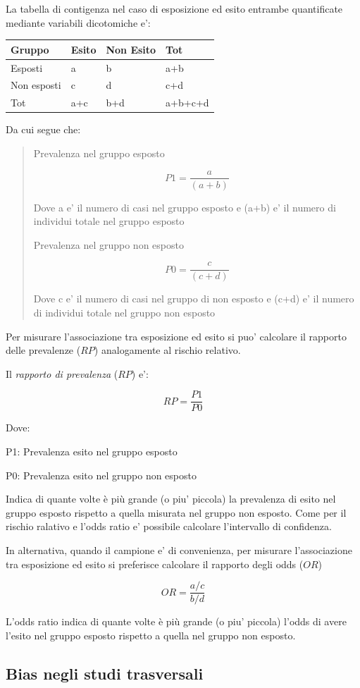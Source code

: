 \documentclass[]{book}
\begin{document}
La tabella di contigenza nel caso di esposizione ed esito entrambe quantificate mediante variabili dicotomiche e':

\begin{longtable}[]{@{}llll@{}}
\toprule
Gruppo & Esito & Non Esito & Tot\tabularnewline
\midrule
\endhead
Esposti & a & b & a+b\tabularnewline
Non esposti & c & d & c+d\tabularnewline
Tot & a+c & b+d & a+b+c+d\tabularnewline
\bottomrule
\end{longtable}

Da cui segue che:

\begin{quote}
Prevalenza nel gruppo esposto

\[P1 = \frac{a}{(a+b)}\]

Dove a e' il numero di casi nel gruppo esposto e (a+b) e' il numero di individui totale nel gruppo esposto

Prevalenza nel gruppo non esposto

\[P0 = \frac{c}{(c+d)}\]

Dove c e' il numero di casi nel gruppo di non esposto e (c+d) e' il numero di individui totale nel gruppo non esposto
\end{quote}

Per misurare l'associazione tra esposizione ed esito si puo' calcolare il rapporto delle prevalenze (\(RP\)) analogamente al rischio relativo.

Il \emph{rapporto di prevalenza} (\(RP\)) e':

\[ RP = \frac{ P1 }{P0}\]

Dove:

P1: Prevalenza esito nel gruppo esposto

P0: Prevalenza esito nel gruppo non esposto

Indica di quante volte è più grande (o piu' piccola) la prevalenza di esito nel gruppo esposto rispetto a quella misurata nel gruppo non esposto. Come per il rischio ralativo e l'odds ratio e' possibile calcolare l'intervallo di confidenza.

In alternativa, quando il campione e' di convenienza, per misurare l'associazione tra esposizione ed esito si preferisce calcolare il rapporto degli odds (\(OR\))

\[ OR = \frac{ a / c }{b / d} \]

L'odds ratio indica di quante volte è più grande (o piu' piccola) l'odds di avere l'esito nel gruppo esposto rispetto a quella nel gruppo non esposto.

\hypertarget{bias-negli-studi-trasversali}{%
\subsection{Bias negli studi trasversali}\label{bias-negli-studi-trasversali}}
\end{document}
